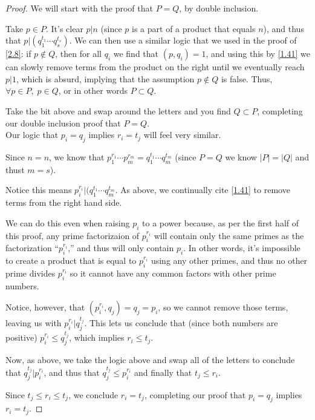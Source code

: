 \documentclass[../main.tex]{subfiles}
\begin{document}
\begin{proof}
  We will start with the proof that $P = Q$, by double inclusion.

  Take $p \in P$. It's clear $p | n$ (since $p$ is a part of a product that equals $n$), and thus that $p | (q_1^{t_1} \cdots q_s^{t_s})$. We can then use a similar logic that we used in the proof of \ref{2.8}: if $p \not \in Q$, then for all $q_i$ we find that $(p, q_i) = 1$, and using this by \ref{1.41} we can slowly remove terms from the product on the right until we eventually reach $p | 1$, which is absurd, implying that the assumption $p \not \in Q$ is false. Thus, $\forall p \in P, \; p \in Q$, or in other words $P \subset Q$.

  Take the bit above and swap around the letters and you find $Q \subset P$, completing our double inclusion proof that $P = Q$. \\[0ex]

   Our logic that $p_i = q_j$ implies $r_i = t_j$ will feel very similar.

   Since $n=n$, we know that $p_1^{r_1} \cdots p_m^{r_m} = q_1^{t_1} \cdots q_m^{t_m}$ (since $P = Q$ we know $|P| = |Q|$ and thust $m = s$).

   Notice this means $p_i^{r_i} | (q_1^{t_1} \cdots q_m^{t_m}$. As above, we continually cite \ref{1.41} to remove terms from the right hand side.

   We can do this even when raising $p_i$ to a power because, as per the first half of this proof, any prime factorizaion of $p_i^{r_i}$ will contain only the same primes as the factorization ``$p_i^{r_i}$,'' and thus will only contain $p_i$. In other words, it's impossible to create a product that is equal to $p_i^{r_i}$ using any other primes, and thus no other prime divides $p_i^{r_i}$ so it cannot have any common factors with other prime numbers.

   Notice, however, that $(p_i^{r_i}, q_j) = q_j = p_i$, so we cannot remove those terms, leaving us with $p_i^{r_i} | q_j^{t_j}$. This lets us conclude that (since both numbers are positive) $p_i^{r_i} \leq q_j^{t_j}$, which implies $r_i \leq t_j$.

   Now, as above, we take the logic above and swap all of the letters to conclude that $q_j^{t_j} | p_i^{r_i}$, and thus that $q_j^{t_j} \leq p_i^{r_i}$ and finally that $t_j \leq r_i$.

   Since $t_j \leq r_i \leq t_j$, we conclude $r_i = t_j$, completing our proof that $p_i = q_j$ implies $r_i = t_j$.
\end{proof}
\end{document}
